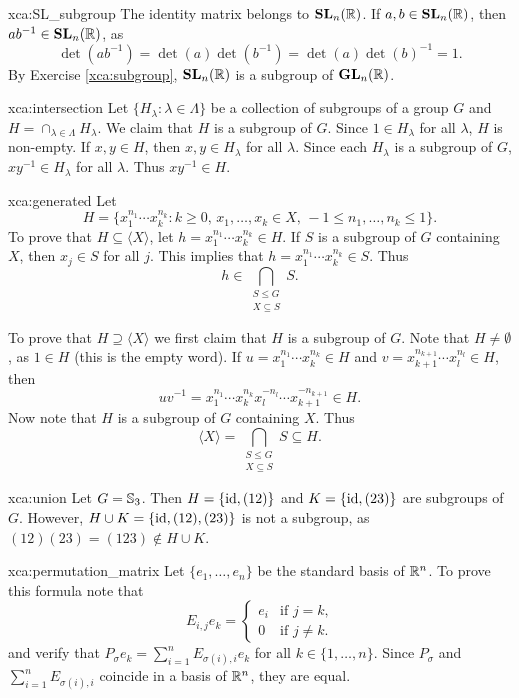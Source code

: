 \begin{sol}{xca:SL_subgroup}
    The identity matrix belongs to $\mathbf{SL}_n(\mathbb{R})$. If $a,b\in\mathbf{SL}_n(\mathbb{R})$, then 
    $ab^{-1}\in\mathbf{SL}_n(\mathbb{R})$, as 
    \[
    \det(ab^{-1})=\det(a)\det(b^{-1})=\det(a)\det(b)^{-1}=1.
    \]
    By Exercise \ref{xca:subgroup}, $\mathbf{SL}_n(\mathbb{R})$ is a subgroup of $\mathbf{GL}_n(\mathbb{R})$. 
\end{sol}

\begin{sol}{xca:intersection}
    Let $\{H_\lambda:\lambda\in\Lambda\}$ be a collection of subgroups of a group $G$ and 
    $H=\cap_{\lambda\in \Lambda}H_\lambda$. We claim that $H$ is a subgroup of $G$. Since
    $1\in H_\lambda$ for all $\lambda$, $H$ is non-empty. If $x,y\in H$, then $x,y\in H_\lambda$ for all $\lambda$. 
    Since each $H_\lambda$ is a subgroup of $G$, $xy^{-1}\in H_\lambda$ for all $\lambda$. Thus $xy^{-1}\in H$.
\end{sol}

\begin{sol}{xca:generated}
    Let 
    \[
    H=\{x_1^{n_1}\cdots x_k^{n_k}:k\geq0,\,x_1,\dots,x_k\in X,\,-1\leq n_1,\dots,n_k\leq 1\}.
    \]
    To prove that $H\subseteq\langle X\rangle$, let $h=x_1^{n_1}\cdots x_k^{n_k}\in H$. 
    If $S$ is a subgroup of $G$ containing $X$, then $x_j\in S$ for all $j$. This implies that 
    $h=x_1^{n_1}\cdots x_k^{n_k}\in S$. Thus 
    \[
    h\in\bigcap_{\substack{S\leq G\\X\subseteq S}}S.
    \]
    
    To prove that $H\supseteq \langle X\rangle$ we first 
    claim that $H$ is a subgroup of $G$. Note that $H\ne\emptyset$, as $1\in H$ (this is the empty word). If 
    $u=x_1^{n_1}\cdots x_k^{n_k}\in H$ and 
    $v=x_{k+1}^{n_{k+1}}\cdots x_{l}^{n_l}\in H$, then 
    \[
    uv^{-1}=x_1^{n_1}\cdots x_k^{n_k}x_{l}^{-n_{l}}\cdots x_{k+1}^{-n_{k+1}}\in H. 
    \]
    Now note that $H$ is a subgroup of $G$ containing $X$. Thus 
    \[
    \langle X\rangle=\bigcap_{\substack{S\leq G\\X\subseteq S}}S\subseteq H.
    \]
\end{sol}

\begin{sol}{xca:union}
    Let $G=\mathbb{S}_3$. Then $H=\{\operatorname{id},(12)\}$ and 
    $K=\{\operatorname{id},(23)\}$ are subgroups of $G$. However, 
    $H\cup K=\{\operatorname{id},(12),(23)\}$ is not a subgroup, as 
    $(12)(23)=(123)\not\in H\cup K$. 
\end{sol}

\begin{sol}{xca:permutation_matrix}
Let $\{e_1,\dots,e_n\}$ be the standard basis of $\mathbb{R}^n$. 
To prove this formula note that
\[
E_{i,j}e_k=\begin{cases}
    e_i&\text{if $j=k$,}\\
    0 & \text{if $j\ne k$}.
\end{cases}
\]
and verify that 
$P_\sigma e_k=\sum_{i=1}^n E_{\sigma(i),i}e_k$ 
for all $k\in\{1,\dots,n\}$. Since $P_\sigma$ and
$\sum_{i=1}^n E_{\sigma(i),i}$ coincide in a basis of $\mathbb{R}^n$, 
they are equal. 
\end{sol} 

